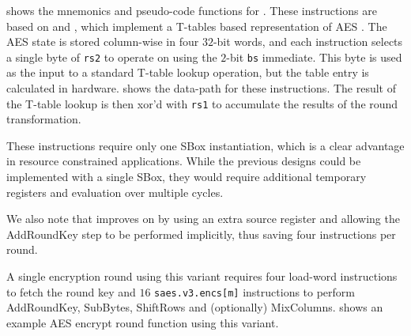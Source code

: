 

 shows the mnemonics and pseudo-code functions
for .
These instructions are based on
\cite{NadIkeKur:04,BBFR:06} and \cite{Saarinen:20},
which implement a T-tables based representation of AES \cite{DaeRij:02}.
The AES state is stored column-wise in four $32$-bit words, and
each instruction selects a single byte of {\tt rs2} to operate on
using the $2$-bit {\tt bs} immediate.
This byte is used as the input to a standard T-table lookup operation,
but the table entry is calculated in hardware.
 shows the data-path for these instructions.
The result of the T-table lookup is then xor'd with {\tt rs1} to
accumulate the results of the round transformation.

These instructions require only one SBox instantiation,
which is a clear advantage in resource constrained applications.
While the previous designs could be implemented with a single SBox, they
would require additional temporary registers and evaluation over multiple
cycles.

We also note that \cite{Saarinen:20} improves on \cite{BBFR:06}
by using an extra source register and allowing the AddRoundKey step to be
performed implicitly, thus saving four instructions per round.

A single encryption round using this variant requires
four load-word instructions to fetch the round key and
$16$ {\tt saes.v3.encs[m]} instructions to perform AddRoundKey,
SubBytes, ShiftRows and (optionally) MixColumns.
 shows an example AES encrypt round function
using this variant.

